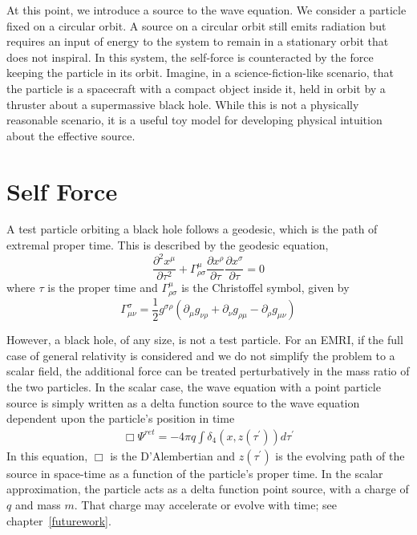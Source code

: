At this point, we introduce a source to the wave equation. We consider a particle fixed on a circular orbit. A source on a circular orbit still emits radiation but requires an input of energy to the system to remain in a stationary orbit that does not inspiral. In this system, the self-force is counteracted by the force keeping the particle in its orbit. Imagine, in a science-fiction-like scenario, that the particle is a spacecraft with a compact object inside it, held in orbit by a thruster about a supermassive black hole. While this is not a physically reasonable scenario, it is a useful toy model for developing physical intuition about the effective source. 

\section{Self Force}




A test particle orbiting a black hole follows a geodesic, which is the path of extremal proper time. This is described by the geodesic equation,
\begin{equation}
\frac{\partial^2x^\mu}{\partial\tau^2}+\Gamma^\mu_{\rho\sigma}\frac{\partial x^\rho}{\partial \tau}\frac{\partial x^\sigma}{\partial \tau}=0
\end{equation}
where $\tau$ is the proper time and $\Gamma^\mu_{\rho\sigma}$ is the Christoffel symbol, given by~\cite{Carroll}
\begin{equation}
\Gamma^\sigma_{\mu\nu}=\frac{1}{2}g^{\sigma\rho}(\partial_\mu g_{\nu\rho}+\partial_\nu g_{\rho\mu} - \partial_\rho g_{\mu\nu})
\end{equation}

However, a black hole, of any size, is not a test particle. For an EMRI, if the full case of general relativity is considered and we do not simplify the problem to a scalar field, the additional force can be treated perturbatively in the mass ratio of the two particles. In the scalar case, the wave equation with a point particle source is simply written as a delta function source to the wave equation dependent upon the particle's position in time~\cite{WardellSelfForceReview}
\begin{eqnarray}
  \Box\Psi^{ret}=-4\pi q\int\delta_4(x,z(\tau^\prime))d\tau^\prime
\end{eqnarray}
In this equation, $\Box$ is the D'Alembertian and $z(\tau^\prime)$ is the evolving path of the source in space-time as a function of the particle's proper time. In the scalar approximation, the particle acts as a delta function point source, with a charge of $q$ and mass $m$. That charge may accelerate or evolve with time; see chapter~\ref{futurework}. 

